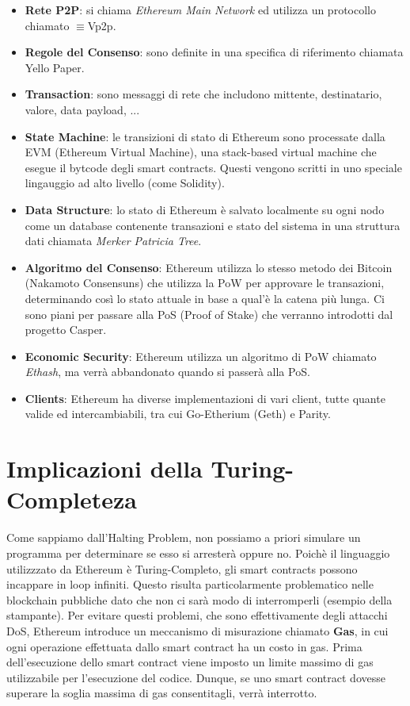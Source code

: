 \begin{itemize}
    \item \textbf{Rete P2P}: si chiama \textit{Ethereum Main Network} ed
          utilizza un protocollo chiamato \DH$\equiv$Vp2p.
    \item \textbf{Regole del Consenso}: sono definite in una specifica di riferimento chiamata
          Yello Paper.
    \item \textbf{Transaction}: sono messaggi di rete che includono mittente, destinatario,
          valore, data payload, ...
    \item \textbf{State Machine}: le transizioni di stato di Ethereum sono processate dalla
          EVM (Ethereum Virtual Machine), una stack-based virtual machine che esegue il bytcode
          degli smart contracts. Questi vengono scritti in uno speciale lingauggio ad alto livello
          (come Solidity).
    \item \textbf{Data Structure}: lo stato di Ethereum è salvato localmente su ogni nodo come
          un database contenente transazioni e stato del sistema in una struttura dati chiamata
          \textit{Merker Patricia Tree}.
    \item \textbf{Algoritmo del Consenso}: Ethereum utilizza lo stesso metodo dei Bitcoin
          (Nakamoto Consensuns) che utilizza la PoW per approvare le transazioni,
          determinando così lo stato attuale in base a qual'è la catena più lunga.
          Ci sono piani per passare alla PoS (Proof of Stake) che verranno introdotti dal
          progetto Casper.
    \item \textbf{Economic Security}: Ethereum utilizza un algoritmo di PoW chiamato \textit{Ethash},
          ma verrà abbandonato quando si passerà alla PoS.
    \item \textbf{Clients}: Ethereum ha diverse implementazioni di vari client,
          tutte quante valide ed intercambiabili, tra cui Go-Etherium (Geth) e Parity.
\end{itemize}

\section{Implicazioni della Turing-Completeza}
Come sappiamo dall'Halting Problem, non possiamo a priori simulare un programma per
determinare se esso si arresterà oppure no. Poichè il linguaggio utilizzzato da Ethereum è
Turing-Completo, gli smart contracts possono incappare in loop infiniti. Questo risulta
particolarmente problematico nelle blockchain pubbliche dato che non ci sarà modo di interromperli
(esempio della stampante). Per evitare questi problemi, che sono effettivamente degli attacchi DoS,
Ethereum introduce un meccanismo di misurazione chiamato \textbf{Gas}, in cui ogni operazione
effettuata dallo smart contract ha un costo in gas. Prima dell'esecuzione dello smart contract
viene imposto un limite massimo di gas utilizzabile per l'esecuzione del codice.
Dunque, se uno smart contract dovesse superare la soglia massima di gas consentitagli,
verrà interrotto.

